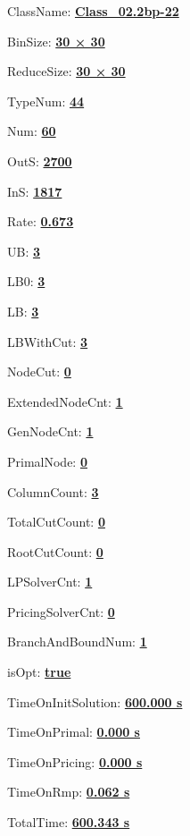 \documentclass[11pt]{article}
\begin{document}
\pagestyle{empty}


ClassName: \underline{\textbf{Class_02.2bp-22}}
\par
BinSize: \underline{\textbf{30 × 30}}
\par
ReduceSize: \underline{\textbf{30 × 30}}
\par
TypeNum: \underline{\textbf{44}}
\par
Num: \underline{\textbf{60}}
\par
OutS: \underline{\textbf{2700}}
\par
InS: \underline{\textbf{1817}}
\par
Rate: \underline{\textbf{0.673}}
\par
UB: \underline{\textbf{3}}
\par
LB0: \underline{\textbf{3}}
\par
LB: \underline{\textbf{3}}
\par
LBWithCut: \underline{\textbf{3}}
\par
NodeCut: \underline{\textbf{0}}
\par
ExtendedNodeCnt: \underline{\textbf{1}}
\par
GenNodeCnt: \underline{\textbf{1}}
\par
PrimalNode: \underline{\textbf{0}}
\par
ColumnCount: \underline{\textbf{3}}
\par
TotalCutCount: \underline{\textbf{0}}
\par
RootCutCount: \underline{\textbf{0}}
\par
LPSolverCnt: \underline{\textbf{1}}
\par
PricingSolverCnt: \underline{\textbf{0}}
\par
BranchAndBoundNum: \underline{\textbf{1}}
\par
isOpt: \underline{\textbf{true}}
\par
TimeOnInitSolution: \underline{\textbf{600.000 s}}
\par
TimeOnPrimal: \underline{\textbf{0.000 s}}
\par
TimeOnPricing: \underline{\textbf{0.000 s}}
\par
TimeOnRmp: \underline{\textbf{0.062 s}}
\par
TotalTime: \underline{\textbf{600.343 s}}
\par
\newpage
\end{document}
